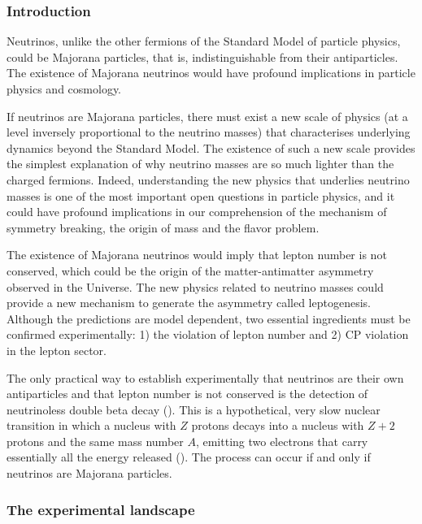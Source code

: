 \subsubsection*{Introduction}
Neutrinos, unlike the other fermions of the Standard Model of particle physics, could be Majorana particles, that is, indistinguishable from their antiparticles. The existence of Majorana neutrinos would have profound implications in particle physics and cosmology. 

 If neutrinos are Majorana particles, there must exist a new scale of physics (at a level inversely proportional to the neutrino masses) that characterises underlying dynamics beyond the Standard Model. The existence of such a new scale provides the simplest explanation of why neutrino masses are so much lighter than the charged fermions. Indeed,  understanding the new physics that underlies neutrino masses is one of the most important open questions in particle physics, and it could have profound implications in our comprehension of the mechanism of symmetry breaking, the origin of mass and the flavor problem. 

The existence of Majorana neutrinos would imply that lepton number is not conserved, which could be the origin of the matter-antimatter asymmetry observed in the Universe. The new physics related to neutrino masses could provide a new mechanism to generate the asymmetry called leptogenesis. Although the predictions are model dependent, two essential ingredients must be confirmed experimentally: 1) the violation of lepton number and 2) CP violation in the lepton sector. 

The only practical way to establish experimentally that neutrinos are their own antiparticles and that lepton number is not conserved is the detection of neutrinoless double beta decay (\bbonu). This is a hypothetical, very slow nuclear transition in which a nucleus with $Z$ protons decays into a nucleus with $Z+2$ protons and the same mass number $A$, emitting two electrons that carry essentially all the energy released (\Qbb). The process can occur if and only if neutrinos are Majorana particles. 

\subsubsection*{The experimental landscape}

